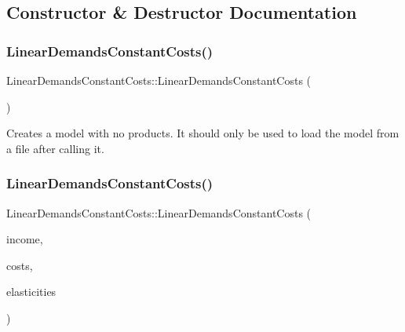 \subsection{Constructor \& Destructor Documentation}
\mbox{\label{classLinearDemandsConstantCosts_a79e3cc71f551a3ad3ecfd5ea3818a6c0}} 
\subsubsection{\texorpdfstring{Linear\+Demands\+Constant\+Costs()}{LinearDemandsConstantCosts()}\hspace{0.1cm}{\footnotesize\ttfamily [1/2]}}
{\footnotesize\ttfamily Linear\+Demands\+Constant\+Costs\+::\+Linear\+Demands\+Constant\+Costs (\begin{DoxyParamCaption}{ }\end{DoxyParamCaption})\hspace{0.3cm}{\ttfamily [default]}}

Creates a model with no products. It should only be used to load the model from a file after calling it. \mbox{\label{classLinearDemandsConstantCosts_a0a7e9c271148594fdc0e4024cfd521a9}} 
\subsubsection{\texorpdfstring{Linear\+Demands\+Constant\+Costs()}{LinearDemandsConstantCosts()}\hspace{0.1cm}{\footnotesize\ttfamily [2/2]}}
{\footnotesize\ttfamily Linear\+Demands\+Constant\+Costs\+::\+Linear\+Demands\+Constant\+Costs (\begin{DoxyParamCaption}\item[{\hyperlink{classColumnVector}{Column\+Vector} const \&}]{income,  }\item[{\hyperlink{classColumnVector}{Column\+Vector} const \&}]{costs,  }\item[{\hyperlink{classMatrix}{Matrix} const \&}]{elasticities }\end{DoxyParamCaption})}

